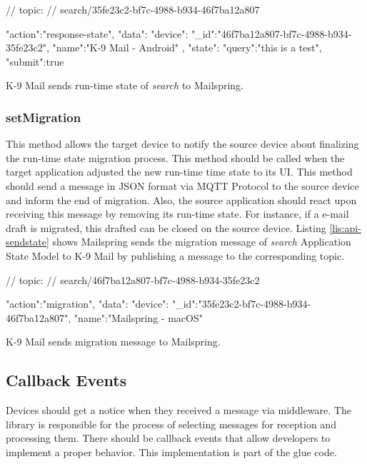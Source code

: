 \FloatBarrier
\begin{code}
\begin{js2}
// topic:
// search/35fe23c2-bf7c-4988-b934-46f7ba12a807
\end{js2}

\begin{json}
{
   "action":"response-state",
   "data":{
      "device":{
         "_id":"46f7ba12a807-bf7c-4988-b934-35fe23c2",
         "name":"K-9 Mail - Android"
      },
      "state":{
         "query":"this is a test",
         "submit":true
      }
   }
}
\end{json}
\caption{K-9 Mail sends run-time state of \textit{search} to Mailspring.}
\label{lis:api-sendstate}
\end{code}
\FloatBarrier

\subsubsection{setMigration}
This method allows the target device to notify the source device about finalizing the run-time state migration process. This method should be called when the target application adjusted the new run-time time state to its UI. This method should send a message in JSON format via MQTT Protocol to the source device and inform the end of migration. Also, the source application should react upon receiving this message by removing its run-time state. For instance, if a e-mail draft is migrated, this drafted can be closed on the source device. Listing \ref{lis:api-sendstate} shows Mailspring sends the migration message of \textit{search} Application State Model to K-9 Mail by publishing a message to the corresponding topic.

\FloatBarrier
\begin{code}
\begin{js2}
// topic:
// search/46f7ba12a807-bf7c-4988-b934-35fe23c2
\end{js2}

\begin{json}
{
   "action":"migration",
   "data":{
      "device":{
         "_id":"35fe23c2-bf7c-4988-b934-46f7ba12a807",
         "name":"Mailspring - macOS"
      }
   }
}
\end{json}
\caption{K-9 Mail sends migration message to Mailspring.}
\label{lis:api-setmigration}
\end{code}
\FloatBarrier

\subsection{Callback Events}
Devices should get a notice when they received a message via middleware. The library is responsible for the process of selecting messages for reception and processing them. There should be callback events that allow developers to implement a proper behavior. This implementation is part of the glue code.

